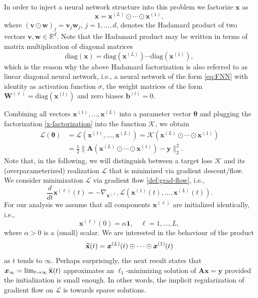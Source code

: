 \documentclass{svproc}
\newcommand{\corr}[1]{#1}
\newcommand{\bA}{\boldsymbol{A}}
\newcommand{\bb}{\boldsymbol{b}}
\newcommand{\bv}{\boldsymbol{v}}
\newcommand{\bw}{\boldsymbol{w}}
\newcommand{\bW}{\boldsymbol{W}}
\newcommand{\bx}{\boldsymbol{x}}
\newcommand{\by}{\boldsymbol{y}}
\newcommand{\btheta}{{\boldsymbol{\theta}}}
\newcommand{\0}{\boldsymbol{0}}
\newcommand{\1}{\boldsymbol{1}}
\renewcommand{\tilde}{\widetilde}
\def\R{\mathbb{R}}
\def\xprod{\tilde{\bf x}}
\newcommand{\diag}{\mathrm{diag}}
\begin{document}
In order to inject a neural network structure into this problem we factorize $\bx$ as %
\begin{equation}
\label{x-factorization}
\bx = \bx^{(L)}\odot\cdots\odot\bx^{(1)},
\end{equation}
where $(\bv \odot \bw)_j = \bv_j \bw_j$, $j=1,\hdots,d$, denotes the Hadamard product of two vectors $\bv,\bw \in \R^d$.
Note that the Hadamard product may be written in terms of matrix multiplication of diagonal matrices
\[
\diag(\bx) = \diag(\bx^{(L)}) \cdots \diag(\bx^{(1)}),
\]
which is the reason why the above Hadamard factorization is also referred to as linear diagonal neural network, i.e.,
a neural network of the form \eqref{eq:FNN} with identity as activation function $\sigma$, the weight matrices of the form $\bW^{(\ell)} = \diag(\bx^{(l)})$ and zero biases $\bb^{(l)}=0$. 

Combining all vectors \corr{$\bx^{(1)},\hdots,\bx^{(L)}$} into a parameter vector $\btheta$ and plugging the factorization \eqref{x-factorization} into the function \corr{$\mathcal{K}$,} we obtain
\begin{align*}
    \mathcal{L}(\btheta) &= \mathcal{L}(\bx^{(1)},\hdots,\bx^{(L)})
    = \mathcal{K}(\bx^{(L)} \odot \cdots \odot \bx^{(1)}) \\
    &= \frac{1}{2} \|\bA (\bx^{(L)}\odot \cdots \odot \bx^{(1)}) - \by\|_2^2.
\end{align*}
Note that, in the following, we will distinguish between a target loss $\mathcal K$ and its (overparameterized) realization $\mathcal L$ that is minimized via gradient descent/flow.
We consider minimization $\mathcal{L}$ via gradient flow \eqref{def:grad-flow}, i.e.,
\begin{equation}
\label{grad-flow-diag}
\frac{d}{dt} \bx^{(\ell)}(t) = - \nabla_{\bx^{(\ell)}} \mathcal{L}(\bx^{(1)}(t),\hdots,\bx^{(L)}(t)).
\end{equation}
For our analysis we assume that all components $\bx^{(\ell)}$ are initialized identically, i.e.,
\begin{equation}
\label{diag-init}
\bx^{(\ell)}(0) = \alpha \1, \quad \ell = 1,\hdots, L,
\end{equation}
where $\alpha > 0$ is a (small) scalar.
We are interested in the behaviour of the product
\begin{equation}
\label{prod-diag}
\xprod(t) = \bx^{(L)}(t)\odot\cdots\odot\bx^{(1)}(t)
\end{equation}
as $t$ tends to $\infty$. Perhaps surprisingly, 
the next result \cite[Theorem 2.1]{chou2023more} states that $\bx_\infty = \lim_{t \to \infty} \xprod(t)$ approximates an $\ell_1$-minimizing solution of $\bA \bx = \by$ provided the initialization is small enough. In other words, the implicit regularization
of gradient flow on $\mathcal{L}$ is towards sparse solutions.
\end{document}
